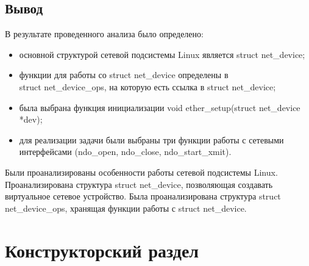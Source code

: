 \documentclass[14pt, a4paper]{extarticle}
\begin{document}
\subsection{Вывод}
В результате проведенного анализа было определено:
\begin{itemize}
	\item основной структурой сетевой подсистемы Linux является struct net\_device;
	\item функции для работы со struct net\_device определены в \\ struct net\_device\_ops, на которую есть ссылка в struct net\_device;
	\item была выбрана функция инициализации void ether\_setup(struct net\_device *dev);
	\item для реализации задачи были выбраны три функции работы с сетевыми интерфейсами (ndo\_open, ndo\_close, ndo\_start\_xmit).
\end{itemize}
Были проанализированы особенности работы сетевой подсистемы Linux. Проанализирована структура struct net\_device, позволяющая создавать виртуальное сетевое устройство. Была проанализирована структура struct net\_device\_ops, хранящая функции работы с struct net\_device.

\clearpage
\section{Конструкторский раздел}
\end{document}
